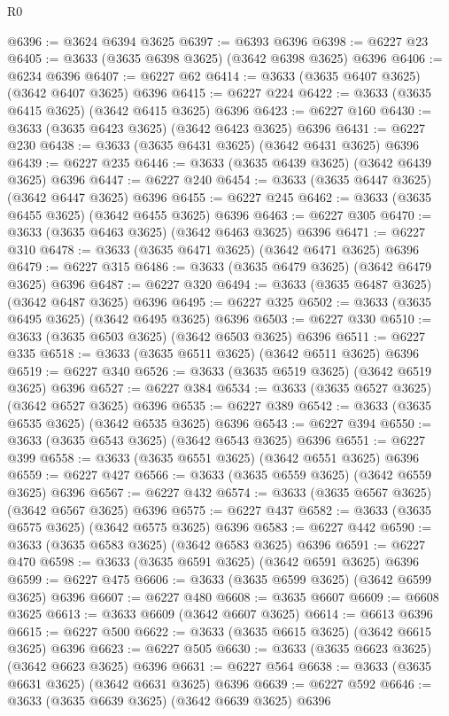 \begin{lexlean}{R0}
\begin{coremodule}
@6396 := @3624 @6394 @3625
@6397 := @6393 @6396
@6398 := @6227 @23
@6405 := @3633 (@3635 @6398 @3625) (@3642 @6398 @3625) @6396
@6406 := @6234 @6396
@6407 := @6227 @62
@6414 := @3633 (@3635 @6407 @3625) (@3642 @6407 @3625) @6396
@6415 := @6227 @224
@6422 := @3633 (@3635 @6415 @3625) (@3642 @6415 @3625) @6396
@6423 := @6227 @160
@6430 := @3633 (@3635 @6423 @3625) (@3642 @6423 @3625) @6396
@6431 := @6227 @230
@6438 := @3633 (@3635 @6431 @3625) (@3642 @6431 @3625) @6396
@6439 := @6227 @235
@6446 := @3633 (@3635 @6439 @3625) (@3642 @6439 @3625) @6396
@6447 := @6227 @240
@6454 := @3633 (@3635 @6447 @3625) (@3642 @6447 @3625) @6396
@6455 := @6227 @245
@6462 := @3633 (@3635 @6455 @3625) (@3642 @6455 @3625) @6396
@6463 := @6227 @305
@6470 := @3633 (@3635 @6463 @3625) (@3642 @6463 @3625) @6396
@6471 := @6227 @310
@6478 := @3633 (@3635 @6471 @3625) (@3642 @6471 @3625) @6396
@6479 := @6227 @315
@6486 := @3633 (@3635 @6479 @3625) (@3642 @6479 @3625) @6396
@6487 := @6227 @320
@6494 := @3633 (@3635 @6487 @3625) (@3642 @6487 @3625) @6396
@6495 := @6227 @325
@6502 := @3633 (@3635 @6495 @3625) (@3642 @6495 @3625) @6396
@6503 := @6227 @330
@6510 := @3633 (@3635 @6503 @3625) (@3642 @6503 @3625) @6396
@6511 := @6227 @335
@6518 := @3633 (@3635 @6511 @3625) (@3642 @6511 @3625) @6396
@6519 := @6227 @340
@6526 := @3633 (@3635 @6519 @3625) (@3642 @6519 @3625) @6396
@6527 := @6227 @384
@6534 := @3633 (@3635 @6527 @3625) (@3642 @6527 @3625) @6396
@6535 := @6227 @389
@6542 := @3633 (@3635 @6535 @3625) (@3642 @6535 @3625) @6396
@6543 := @6227 @394
@6550 := @3633 (@3635 @6543 @3625) (@3642 @6543 @3625) @6396
@6551 := @6227 @399
@6558 := @3633 (@3635 @6551 @3625) (@3642 @6551 @3625) @6396
@6559 := @6227 @427
@6566 := @3633 (@3635 @6559 @3625) (@3642 @6559 @3625) @6396
@6567 := @6227 @432
@6574 := @3633 (@3635 @6567 @3625) (@3642 @6567 @3625) @6396
@6575 := @6227 @437
@6582 := @3633 (@3635 @6575 @3625) (@3642 @6575 @3625) @6396
@6583 := @6227 @442
@6590 := @3633 (@3635 @6583 @3625) (@3642 @6583 @3625) @6396
@6591 := @6227 @470
@6598 := @3633 (@3635 @6591 @3625) (@3642 @6591 @3625) @6396
@6599 := @6227 @475
@6606 := @3633 (@3635 @6599 @3625) (@3642 @6599 @3625) @6396
@6607 := @6227 @480
@6608 := @3635 @6607
@6609 := @6608 @3625
@6613 := @3633 @6609 (@3642 @6607 @3625)
@6614 := @6613 @6396
@6615 := @6227 @500
@6622 := @3633 (@3635 @6615 @3625) (@3642 @6615 @3625) @6396
@6623 := @6227 @505
@6630 := @3633 (@3635 @6623 @3625) (@3642 @6623 @3625) @6396
@6631 := @6227 @564
@6638 := @3633 (@3635 @6631 @3625) (@3642 @6631 @3625) @6396
@6639 := @6227 @592
@6646 := @3633 (@3635 @6639 @3625) (@3642 @6639 @3625) @6396

\end{coremodule}
\end{lexlean}
